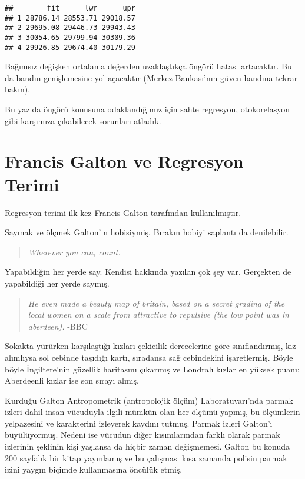 \documentclass[
]{book}
\begin{document}
\begin{verbatim}
##        fit      lwr      upr
## 1 28786.14 28553.71 29018.57
## 2 29695.08 29446.73 29943.43
## 3 30054.65 29799.94 30309.36
## 4 29926.85 29674.40 30179.29
\end{verbatim}

Bağımsız değişken ortalama değerden uzaklaştıkça öngörü hatası artacaktır. Bu da bandın genişlemesine yol açacaktır (Merkez Bankası'nın güven bandına tekrar bakın).

Bu yazıda öngörü konusuna odaklandığımız için sahte regresyon, otokorelasyon gibi karşımıza çıkabilecek sorunları atladık.

\hypertarget{francis-galton-ve-regresyon-terimi}{%
\chapter{Francis Galton ve Regresyon Terimi}\label{francis-galton-ve-regresyon-terimi}}

Regresyon terimi ilk kez Francis Galton tarafından kullanılmıştır.

Saymak ve ölçmek Galton'ın hobisiymiş. Bırakın hobiyi saplantı da denilebilir.

\begin{quote}
\emph{Wherever you can, count.}
\end{quote}

Yapabildiğin her yerde say. Kendisi hakkında yazılan çok şey var. Gerçekten de yapabildiği her yerde saymış.

\begin{quote}
\emph{He even made a beauty map of britain, based on a secret grading of the local women on a scale from attractive to repulsive (the low point was in aberdeen).} -BBC
\end{quote}

Sokakta yürürken karşılaştığı kızları çekicilik derecelerine göre sınıflandırmış, kız alımlıysa sol cebinde taşıdığı kartı, sıradansa sağ cebindekini işaretlermiş. Böyle böyle İngiltere'nin güzellik haritasını çıkarmış ve Londralı kızlar en yüksek puanı; Aberdeenli kızlar ise son sırayı almış.

Kurduğu Galton Antropometrik (antropolojik ölçüm) Laboratuvarı'nda parmak izleri dahil insan vücuduyla ilgili mümkün olan her ölçümü yapmış, bu ölçümlerin yelpazesini ve karakterini izleyerek kaydını tutmuş. Parmak izleri Galton'ı büyülüyormuş. Nedeni ise vücudun diğer kısımlarından farklı olarak parmak izlerinin şeklinin kişi yaşlansa da hiçbir zaman değişmemesi. Galton bu konuda 200 sayfalık bir kitap yayınlamış ve bu çalışması kısa zamanda polisin parmak izini yaygın biçimde kullanmasına öncülük etmiş.
\end{document}
